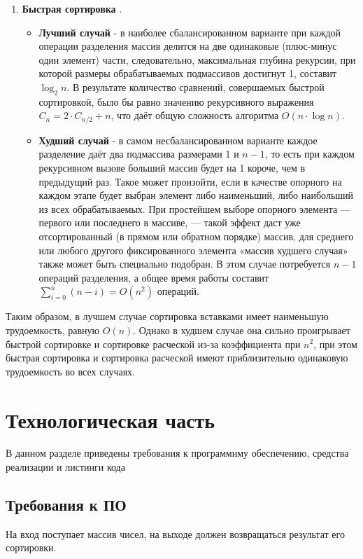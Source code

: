 \documentclass[a4paper,12pt]{report}
\begin{document}
\begin{enumerate}
\item \textbf{Быстрая сортировка} \cite{wiki}.
\begin{itemize}
\item \textbf{Лучший случай} - в наиболее сбалансированном варианте при каждой операции разделения массив делится на две одинаковые (плюс-минус один элемент) части, следовательно, максимальная глубина рекурсии, при которой размеры обрабатываемых подмассивов достигнут 1, составит $\log _{2}n$. В результате количество сравнений, совершаемых быстрой сортировкой, было бы равно значению рекурсивного выражения $C_{n}=2\cdot C_{n/2}+n$, что даёт общую сложность алгоритма $O(n\cdot \log n)$.
\newpage
\item \textbf{Худший случай} - в самом несбалансированном варианте каждое разделение даёт два подмассива размерами 1 и $n-1$, то есть при каждом рекурсивном вызове больший массив будет на 1 короче, чем в предыдущий раз. Такое может произойти, если в качестве опорного на каждом этапе будет выбран элемент либо наименьший, либо наибольший из всех обрабатываемых. При простейшем выборе опорного элемента — первого или последнего в массиве, — такой эффект даст уже отсортированный (в прямом или обратном порядке) массив, для среднего или любого другого фиксированного элемента «массив худшего случая» также может быть специально подобран. В этом случае потребуется $n-1$ операций разделения, а общее время работы составит $\sum _{i=0}^{n}(n-i)=O(n^{2})$ операций.
\end{itemize}
\end{enumerate}

Таким образом, в лучшем случае сортировка вставками имеет наименьшую трудоемкость, равную $O(n)$. Однако в худшем случае она сильно проигрывает быстрой сортировке и сортировке расческой из-за коэффициента при $n^{2}$, при этом быстрая сортировка и сортировка расческой имеют приблизительно одинаковую трудоемкость во всех случаях.

\chapter{Технологическая часть}
\hspace{0.6cm}В данном разделе приведены требования к программнму обеспечению, средства реализации и листинги кода
\section{Требования к ПО}

\hspace{0.6cm}На вход поступает массив чисел, на выходе должен возвращаться результат его сортировки.
	
\end{document}
